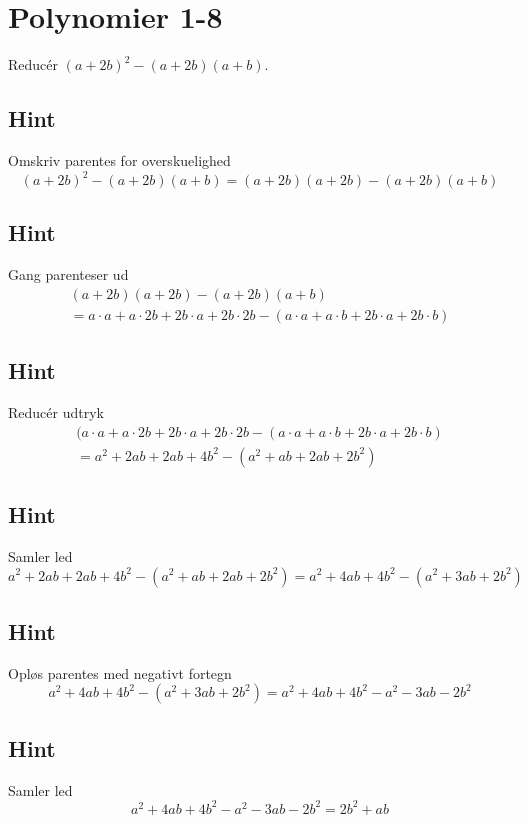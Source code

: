 \documentclass{article}
\newenvironment{exercise}[1]{\newpage\section{#1}}{}
\newcommand{\answerbox}[1]{\fbox{$#1$}}
\newcommand{\hint}{\subsection*{Hint}}
\begin{document}
\begin{exercise}{Polynomier 1-8}
	
	Reducér $(a+2b)^2 - (a+2b)(a+b)$.
	
	\answerbox{2b^2 + ab}
	
	\hint
	
	Omskriv parentes for overskuelighed
	\[
	(a+2b)^2 - (a+2b)(a+b) = (a+2b)(a+2b) - (a+2b)(a+b)
	\]
	
	
	\hint
	
	Gang parenteser ud
	\begin{multline*}
	(a+2b)(a+2b) - (a+2b)(a+b) \\
	= a \cdot a + a \cdot 2b + 2b \cdot a + 2b \cdot 2b - (a \cdot a + a \cdot b + 2b \cdot a + 2b \cdot b)
	\end{multline*}
	
	\hint
	
	Reducér udtryk
	\begin{multline*}
	(a \cdot a + a \cdot 2b + 2b \cdot a + 2b \cdot 2b - (a \cdot a + a \cdot b + 2b \cdot a + 2b \cdot b) \\
	= a^2 + 2ab+2ab+4b^2-(a^2+ab+2ab+2b^2) 
	\end{multline*}
	
	
	\hint
	
	Samler led
	\[
	a^2 + 2ab+2ab+4b^2-(a^2+ab+2ab+2b^2)  = a^2 + 4ab + 4b^2 - (a^2 + 3ab + 2b^2)
	\]
	
	\hint
	
	Opløs parentes med negativt fortegn
	\[
	a^2 + 4ab + 4b^2 - (a^2 + 3ab + 2b^2) = a^2 + 4ab + 4b^2 - a^2 -3ab -2b^2
	\]
	
	
	\hint
	
	Samler led 
	\[
	a^2 + 4ab + 4b^2 - a^2 -3ab -2b^2 = 2b^2 + ab
	\]
	
\end{exercise}
\end{document}
